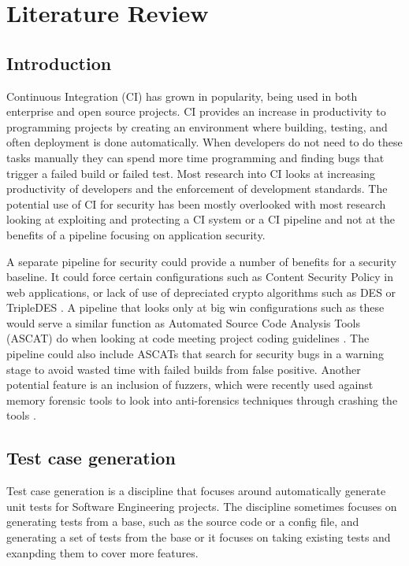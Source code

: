 \section{Literature Review}

\subsection{Introduction}
    Continuous Integration (CI) has grown in popularity, being used in both enterprise and open source projects. CI provides an increase in productivity to programming projects by creating an 
    environment where building, testing, and often deployment is done automatically. When developers do not need to do these tasks manually they can spend more time programming and finding bugs that 
    trigger a failed build or failed test. Most research into CI looks at increasing productivity of developers and the enforcement of development standards. The potential use of CI for security has 
    been mostly overlooked with most research looking at exploiting and protecting a CI system or a CI pipeline and not at the benefits of a pipeline focusing on application security.

	A separate pipeline for security could provide a number of benefits for a security baseline. It could force certain configurations such as Content Security Policy in web applications, or lack of 
    use of depreciated crypto algorithms such as DES or TripleDES \cite{Vehent}. A pipeline that looks only at big win configurations such as these would serve a similar function as Automated Source 
    Code Analysis Tools (ASCAT) do when looking at code meeting project coding guidelines \cite{Zampetti}. The pipeline could also include ASCATs that search for security bugs in a warning stage to 
    avoid wasted time with failed builds from false positive. Another potential feature is an inclusion of fuzzers, which were recently used against memory forensic tools to look into anti-forensics 
    techniques through crashing the tools \cite{Case}.

\subsection{Test case generation}
    Test case generation is a discipline that focuses around automatically generate unit tests for Software Engineering projects. The discipline sometimes focuses on generating tests from a base,
    such as the source code or a config file, and generating a set of tests from the base or it focuses on taking existing tests and exanpding them to cover more features.

